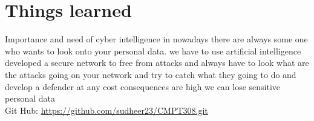 \documentclass{article}
\begin{document}
\section{Things learned} 

Importance and need of cyber intelligence in nowadays there are always some one who wants to look onto your personal data. we have to use artificial intelligence developed a secure network to free from attacks and always have to look what are the attacks going on your network and try to catch what they going to do and develop a defender at any cost consequences are high we can lose sensitive personal data\\
 
Git Hub: \url{ https://github.com/sudheer23/CMPT308.git}
\end{document}
